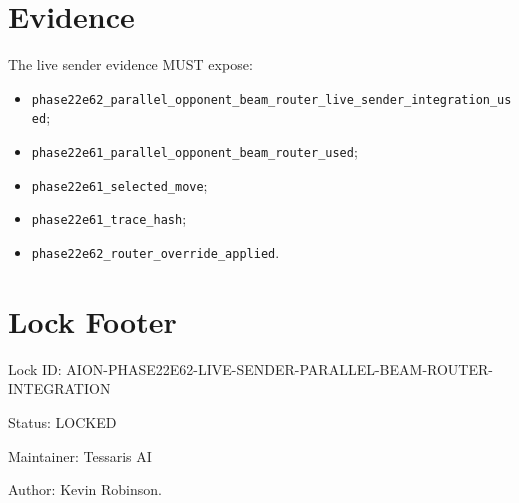 \documentclass[11pt]{article}
\begin{document}
\section{Evidence}

The live sender evidence MUST expose:

\begin{itemize}[nosep]
  \item \texttt{phase22e62\_parallel\_opponent\_beam\_router\_live\_sender\_integration\_used};
  \item \texttt{phase22e61\_parallel\_opponent\_beam\_router\_used};
  \item \texttt{phase22e61\_selected\_move};
  \item \texttt{phase22e61\_trace\_hash};
  \item \texttt{phase22e62\_router\_override\_applied}.
\end{itemize}

\section{Lock Footer}

Lock ID: AION-PHASE22E62-LIVE-SENDER-PARALLEL-BEAM-ROUTER-INTEGRATION

Status: LOCKED

Maintainer: Tessaris AI

Author: Kevin Robinson.
\end{document}
